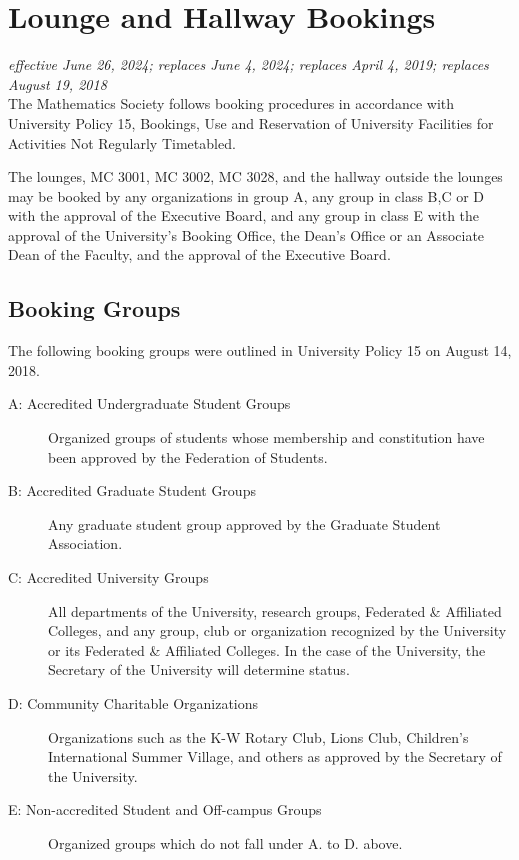 \section{Lounge and Hallway Bookings}
\emph{effective June 26, 2024; replaces June 4, 2024; replaces April 4, 2019; replaces August 19, 2018}\\

The Mathematics Society follows booking procedures in accordance with
University Policy 15, Bookings, Use and Reservation of University Facilities
for Activities Not Regularly Timetabled.

The lounges, MC 3001, MC 3002, MC 3028, and the hallway outside the lounges may be
booked by any organizations in group A, any group in class B,C or D with the approval of the Executive Board, and any group in class E with the approval of the University’s Booking Office, the Dean’s Office or an Associate Dean of the Faculty, and the approval of the Executive Board.

\subsection{Booking Groups}

The following booking groups were outlined in University Policy 15 on
August 14, 2018.

\begin{description}
	\item[A: Accredited Undergraduate Student Groups] Organized groups of students
		whose membership and constitution have been approved by the Federation of
		Students.

	\item[B: Accredited Graduate Student Groups] Any graduate student group
		approved by the Graduate Student Association.

	\item[C: Accredited University Groups] All departments of the University,
		research groups, Federated \& Affiliated Colleges, and any group, club or
		organization recognized by the University or its Federated \& Affiliated
		Colleges. In the case of the University, the Secretary of the University
		will determine status.

	\item[D: Community Charitable Organizations] Organizations such as the K-W
		Rotary Club, Lions Club, Children's International Summer Village, and
		others as approved by the Secretary of the University.

	\item[E: Non-accredited Student and Off-campus Groups] Organized groups which
		do not fall under A. to D. above.
\end{description}

